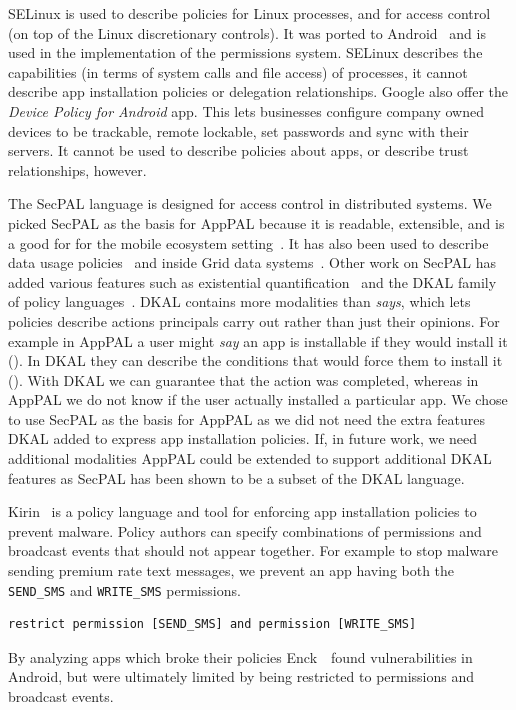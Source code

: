 \documentclass[]{llncs}
\newcommand{\citep}[1]{\cite{#1}}
\begin{document}
SELinux is used to describe policies for Linux processes, and for access control (on top of the Linux discretionary controls).
It was ported to Android~\cite{Smalley:2013vl} and is used in the implementation of the permissions system.
SELinux describes the capabilities (in terms of system calls and file access) of processes, it cannot describe app installation policies or delegation relationships.
Google also offer the \emph{Device Policy for Android} app.
This lets businesses configure company owned devices to be trackable, remote lockable, set passwords and sync with their servers.
It cannot be used to describe policies about apps, or describe trust relationships, however.

The SecPAL language is designed for access control in distributed systems.
We picked SecPAL as the basis for AppPAL because it is readable, extensible, and is a good for for the mobile ecosystem setting~\citep{Hallett:2014un}.
It has also been used to describe data usage policies~\cite{Aziz:2011vt} and inside Grid data systems~\cite{Humphrey:2007wc}.
Other work on SecPAL has added various features such as existential quantification~\cite{Becker:2009vt} and the DKAL family of policy languages~\cite{Gurevich:2008fz,Gurevich:Qo5E3M3}.
DKAL contains more modalities than \emph{says}, which lets policies describe actions principals carry out rather than just their opinions.
For example in AppPAL a user might \emph{say} an app is installable if they would install it ().
In DKAL they can describe the conditions that would force them to install it ().
With DKAL we can guarantee that the action was completed, whereas in AppPAL we do not know if the user actually installed a particular app.
We chose to use SecPAL as the basis for AppPAL as we did not need the extra features DKAL added to express app installation policies.
If, in future work, we need additional modalities AppPAL could be extended to support additional DKAL features as SecPAL has been shown to be a subset of the DKAL language.

Kirin~\cite{Enck:2009ko} is a policy language and tool for enforcing app installation policies to prevent malware.
Policy authors can specify combinations of permissions and broadcast events that should not appear together.
For example to stop malware sending premium rate text messages, we prevent
 an app having both the \texttt{SEND\_SMS} and \texttt{WRITE\_SMS} permissions.
\begin{lstlisting}
restrict permission [SEND_SMS] and permission [WRITE_SMS]
\end{lstlisting}
By analyzing apps which broke their policies Enck~\etal~found vulnerabilities in Android, but were ultimately limited by being restricted to permissions and broadcast events.
\end{document}
